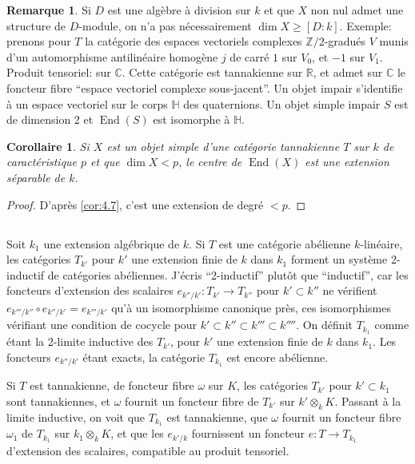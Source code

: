 \documentclass[11pt,a4paper]{article}
\theoremstyle{plain}
\newtheorem{corollary}[theorem]{Corollaire}
\theoremstyle{definition}
\newtheorem{remark}[theorem]{Remarque}
\DeclareMathOperator{\End}{End}
\begin{document}
\begin{remark}\label{rem:4.8}
Si $D$ est une alg\`ebre \`a division sur $k$ et que $X$ non nul admet une structure de $D$-module, on n'a pas n\'ecessairement $\dim X \geq [D:k]$. Exemple: prenons pour $T$ la cat\'egorie des espaces vectoriels complexes $\mathbb{Z}/2$-gradu\'es $V$ munis d'un automorphisme antilin\'eaire homog\`ene $j$ de carr\'e $1$ sur $V_0$, et $-1$ sur $V_1$. Produit tensoriel: sur $\mathbb{C}$. Cette cat\'egorie est tannakienne sur $\mathbb{R}$, et admet sur $\mathbb{C}$ le foncteur fibre ``espace vectoriel complexe sous-jacent''. Un objet impair s'identifie \`a un espace vectoriel sur le corps $\mathbb{H}$ des quaternions. Un objet simple impair $S$ est de dimension 2 et $\End(S)$ est isomorphe \`a $\mathbb{H}$.
\end{remark}

\begin{corollary}\label{cor:4.9}
Si $X$ est un objet simple d'une cat\'egorie tannakienne $T$ sur $k$ de caract\'eristique $p$ et que $\dim X < p$, le centre de $\End(X)$ est une extension s\'eparable de $k$.
\end{corollary}

\begin{proof}
D'apr\`es \ref{cor:4.7}, c'est une extension de degr\'e $< p$.
\end{proof}

\subsection{}
Soit $k_1$ une extension alg\'ebrique de $k$. Si $T$ est une cat\'egorie ab\'elienne $k$-lin\'eaire, les cat\'egories $T_{k'}$ pour $k'$ une extension finie de $k$ dans $k_1$ forment un syst\`eme 2-inductif de cat\'egories ab\'eliennes. J'\'ecris ``2-inductif'' plut\^ot que ``inductif'', car les foncteurs d'extension des scalaires $e_{k''/k'}: T_{k'} \to T_{k''}$ pour $k' \subset k''$ ne v\'erifient $e_{k'''/k''} \circ e_{k''/k'} = e_{k'''/k'}$ qu'\`a un isomorphisme canonique pr\`es, ces isomorphismes v\'erifiant une condition de cocycle pour $k' \subset k'' \subset k''' \subset k''''$. On d\'efinit $T_{k_1}$ comme \'etant la 2-limite inductive des $T_{k'}$, pour $k'$ une extension finie de $k$ dans $k_1$. Les foncteurs $e_{k''/k'}$ \'etant exacts, la cat\'egorie $T_{k_1}$ est encore ab\'elienne.

Si $T$ est tannakienne, de foncteur fibre $\omega$ sur $K$, les cat\'egories $T_{k'}$ pour $k' \subset k_1$ sont tannakiennes, et $\omega$ fournit un foncteur fibre de $T_{k'}$ sur $k' \otimes_k K$. Passant \`a la limite inductive, on voit que $T_{k_1}$ est tannakienne, que $\omega$ fournit un foncteur fibre $\omega_1$ de $T_{k_1}$ sur $k_1 \otimes_k K$, et que les $e_{k'/k}$ fournissent un foncteur $e: T \to T_{k_1}$ d'extension des scalaires, compatible au produit tensoriel.
\end{document}
